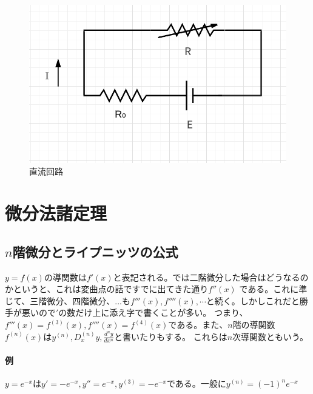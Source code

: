 \documentclass[a4j,dvipdfmx]{jsarticle}
\begin{document}
                \begin{figure}[h]
                    \centering
                    \includegraphics[scale=0.5]{img/QuuNote/tyokuryuukairo.png}
                    \caption{直流回路}\label{fig:直流回路}
                \end{figure}
            \clearpage
            \section{微分法諸定理}
                \subsection{$n$階微分とライプニッツの公式}
                    $y=f(x)$の導関数は$f'(x)$と表記される。では二階微分した場合はどうなるのかというと、これは変曲点の話ですでに出てきた通り$f''(x)$
                    である。これに準じて、三階微分、四階微分、...も$f'''(x),f''''(x),\cdots$と続く。しかしこれだと勝手が悪いので$'$の数だけ上に添え字で書くことが多い。
                    つまり、$f'''(x)=f^{(3)}(x),f''''(x)=f^{(4)}(x)$である。また、$n$階の導関数$f^{(n)}(x)$は$y^{(n)},D_x^{(n)} y,\displaystyle \frac{d^n y}{dx^n}$と書いたりもする。
                    これらは$n$次導関数ともいう。

                    \paragraph{例}$y=e^{-x}$は$y'=-e^{-x},y''=e^{-x},y^{(3)}=-e^{-x}$である。一般に$y^{(n)}=(-1)^ne^{-x}$\\
\end{document}
